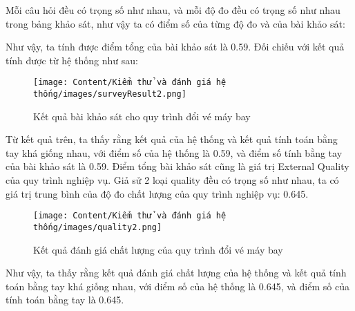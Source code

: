 Mỗi câu hỏi đều có trọng số như nhau, và mỗi độ đo đều có trọng số như nhau trong bảng khảo sát, như vậy ta có điểm số của từng độ đo và của bài khảo sát:
\begin{table}[H]
    \centering
    \caption{Bảng kết quả tổng hợp của khảo sát}
\end{table}
Như vậy, ta tính được điểm tổng của bài khảo sát là 0.59.
Đối chiếu với kết quả tính được từ hệ thống như sau:
\begin{center}
    \begin{figure}[H]
        \centering
        \texttt{[image: Content/Kiểm thử và đánh giá hệ thống/images/surveyResult2.png]}
        \vspace{0.5cm}
        \caption{Kết quả bài khảo sát cho quy trình đổi vé máy bay}
        \label{fig:Kết quả bài khảo sát cho quy trình đổi vé máy bay}
    \end{figure}
\end{center}
Từ kết quả trên, ta thấy rằng kết quả của hệ thống và kết quả tính toán bằng tay khá giống nhau, với điểm số của hệ thống là 0.59, và điểm số tính bằng tay của bài khảo sát là 0.59.
Điểm tổng bài khảo sát cũng là giá trị External Quality của quy trình nghiệp vụ. Giả sử 2 loại quality đều có trọng số như nhau, ta có giá trị trung bình của độ đo 
chất lượng của quy trình nghiệp vụ: 0.645.
\begin{center}
    \begin{figure}[H]
        \centering
        \texttt{[image: Content/Kiểm thử và đánh giá hệ thống/images/quality2.png]}
        \vspace{0.5cm}
        \caption{Kết quả đánh giá chất lượng của quy trình đổi vé máy bay}
        \label{fig:Kết quả đánh giá chất lượng của quy trình đổi vé máy bay}
    \end{figure}
\end{center}
Như vậy, ta thấy rằng kết quả đánh giá chất lượng của hệ thống và kết quả tính toán bằng tay khá giống nhau, với điểm số của hệ thống là 0.645, và điểm số của tính toán bằng tay là 0.645.
    
